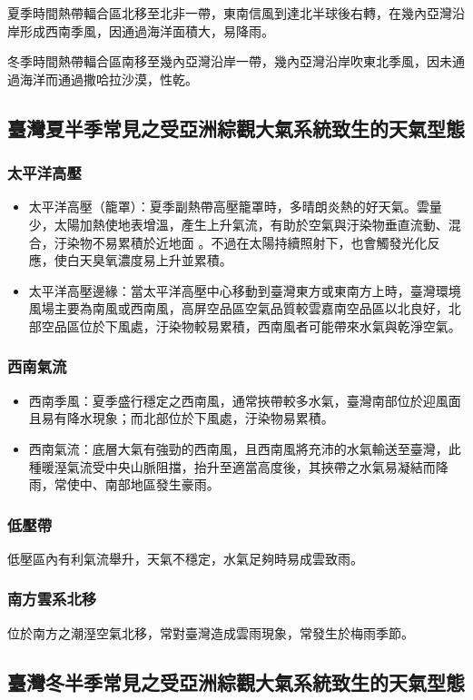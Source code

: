 \documentclass[a4paper,12pt]{report}
\begin{document}
\begin{itemize}
夏季時間熱帶輻合區北移至北非一帶，東南信風到達北半球後右轉，在幾內亞灣沿岸形成西南季風，因通過海洋面積大，易降雨。

冬季時間熱帶輻合區南移至幾內亞灣沿岸一帶，幾內亞灣沿岸吹東北季風，因未通過海洋而通過撒哈拉沙漠，性乾。
\subsection{臺灣夏半季常見之受亞洲綜觀大氣系統致生的天氣型態}
\subsubsection{太平洋高壓}
\begin{itemize}
  \item 太平洋高壓（籠罩）：夏季副熱帶高壓籠罩時，多晴朗炎熱的好天氣。雲量少，太陽加熱使地表增溫，產生上升氣流，有助於空氣與汙染物垂直流動、混合，汙染物不易累積於近地面 。不過在太陽持續照射下，也會觸發光化反應，使白天臭氧濃度易上升並累積。
  \item 太平洋高壓邊緣：當太平洋高壓中心移動到臺灣東方或東南方上時，臺灣環境風場主要為南風或西南風，高屏空品區空氣品質較雲嘉南空品區以北良好，北部空品區位於下風處，汙染物較易累積，西南風者可能帶來水氣與乾淨空氣。
\end{itemize}
\subsubsection{西南氣流}
\begin{itemize}
  \item 西南季風：夏季盛行穩定之西南風，通常挾帶較多水氣，臺灣南部位於迎風面且易有降水現象；而北部位於下風處，汙染物易累積。
  \item 西南氣流：底層大氣有強勁的西南風，且西南風將充沛的水氣輸送至臺灣，此種暖溼氣流受中央山脈阻擋，抬升至適當高度後，其挾帶之水氣易凝結而降雨，常使中、南部地區發生豪雨。
\end{itemize}
\subsubsection{低壓帶}
低壓區內有利氣流舉升，天氣不穩定，水氣足夠時易成雲致雨。
\subsubsection{南方雲系北移}
位於南方之潮溼空氣北移，常對臺灣造成雲雨現象，常發生於梅雨季節。
\subsection{臺灣冬半季常見之受亞洲綜觀大氣系統致生的天氣型態}

\end{itemize}
\end{document}
